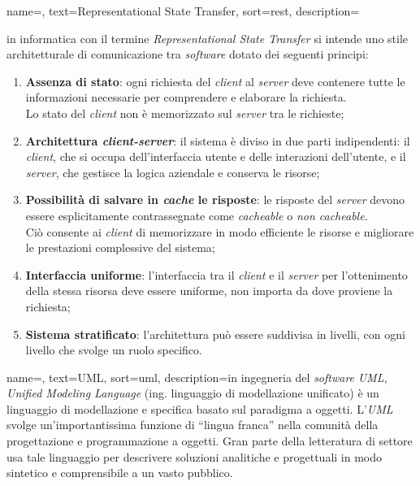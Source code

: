  {
    name=,
    text=Representational State Transfer,
    sort=rest,
    description={in informatica con il termine \emph{Representational State Transfer} si intende uno stile architetturale di comunicazione tra \textit{software} dotato dei seguenti principi: 
    \begin{enumerate}
        \item \textbf{Assenza di stato}: ogni richiesta del \textit{client} al \textit{server} deve contenere tutte le informazioni necessarie per comprendere e elaborare la richiesta. \\ Lo stato del \textit{client} non è memorizzato sul \textit{server} tra le richieste;
        \item \textbf{Architettura \textit{client-server}}: il sistema è diviso in due parti indipendenti: il \textit{client}, che si occupa dell'interfaccia utente e delle interazioni dell'utente, e il \textit{server}, che gestisce la logica aziendale e conserva le risorse;
        \item \textbf{Possibilità di salvare in \textit{cache} le risposte}: le risposte del \textit{server} devono essere esplicitamente contrassegnate come \textit{cacheable} o \textit{non cacheable}. \\ Ciò consente ai \textit{client} di memorizzare in modo efficiente le risorse e migliorare le prestazioni complessive del sistema;
        \item \textbf{Interfaccia uniforme}: l'interfaccia tra il \textit{client} e il \textit{server} per l'ottenimento della stessa risorsa deve essere uniforme, non importa da dove proviene la richiesta;
        \item \textbf{Sistema stratificato}: l'architettura può essere suddivisa in livelli, con ogni livello che svolge un ruolo specifico.
    \end{enumerate}
    \cite{site:rest-ibm}
    }
}

 {
    name=,
    text=UML,
    sort=uml,
    description={in ingegneria del \textit{software} \emph{UML, Unified Modeling Language} (ing. linguaggio di modellazione unificato) è un linguaggio di modellazione e specifica basato sul paradigma a oggetti. L'\emph{UML} svolge un'importantissima funzione di ``lingua franca'' nella comunità della progettazione e programmazione a oggetti. Gran parte della letteratura di settore usa tale linguaggio per descrivere soluzioni analitiche e progettuali in modo sintetico e comprensibile a un vasto pubblico. \\
    \cite{site:uml-wiki}
    }
}


